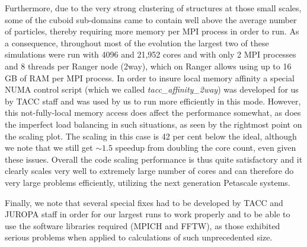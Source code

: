 Furthermore, due to the very strong clustering of structures at those small 
scales, some of the cuboid sub-domains came to contain well above the 
average number of particles, thereby requiring more memory per {\small MPI} process
in order to run. As a consequence, throughout most of the evolution the 
largest two of these simulations were run with 4096 and 21,952 cores and 
with only 2 {\small MPI} processes and 8 threads per Ranger node (2way), which on 
Ranger allows using up to 16 GB of RAM per {\small MPI }process. In order to insure 
local memory affinity a special NUMA control script (which we called {\it 
tacc\_affinity\_2way}) 
was developed for us by TACC staff and was used by us to run more efficiently 
in this mode. However, this not-fully-local memory access does affect the 
performance somewhat, as does the imperfect load balancing in such situations,
as seen by the rightmost point on the scaling plot. The scaling in this case
is 42 per cent below the ideal, although we note that we still get $\sim1.5$ speedup
from doubling the core count, even given these issues. Overall the
code scaling performance is thus quite satisfactory and it clearly 
scales very well to extremely large number of cores and can therefore 
do very large problems efficiently, utilizing the next generation 
Petascale systems. 

Finally, we note that several special fixes had to be developed by TACC 
and JUROPA staff in order for our largest runs to work properly and to be 
able to use the software libraries required ({\small MPICH} and {\small FFTW}), as those 
exhibited serious problems when applied to calculations of such 
unprecedented size. 

